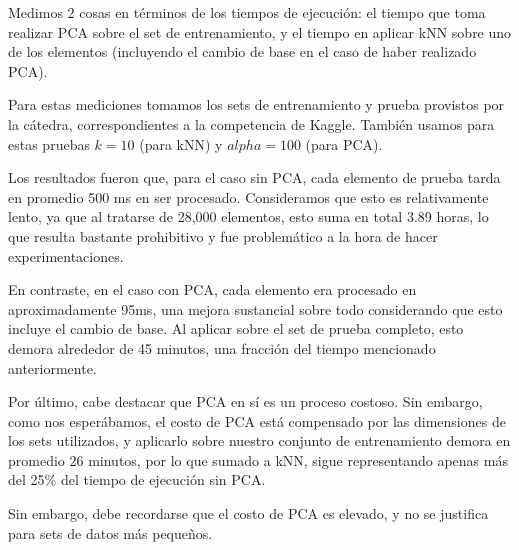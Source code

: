 Medimos 2 cosas en términos de los tiempos de ejecución: el tiempo que toma realizar PCA sobre el set de entrenamiento, y el tiempo en aplicar kNN sobre uno de los elementos (incluyendo el cambio de base en el caso de haber realizado PCA).

Para estas mediciones tomamos los sets de entrenamiento y prueba provistos por la cátedra, correspondientes a la competencia de Kaggle. También usamos para estas pruebas $k = 10$ (para kNN) y $alpha = 100$ (para PCA). 

Los resultados fueron que, para el caso sin PCA, cada elemento de prueba tarda en promedio 500 ms en ser procesado. Consideramos que esto es relativamente lento, ya que al tratarse de 28,000 elementos, esto suma en total 3.89 horas, lo que resulta bastante prohibitivo y fue problemático a la hora de hacer experimentaciones.

En contraste, en el caso con PCA, cada elemento era procesado en aproximadamente 95ms, una mejora sustancial sobre todo considerando que esto incluye el cambio de base. Al aplicar sobre el set de prueba completo, esto demora alrededor de 45 minutos, una fracción del tiempo mencionado anteriormente.

Por último, cabe destacar que PCA en sí es un proceso costoso. Sin embargo, como nos esperábamos, el costo de PCA está compensado por las dimensiones de los sets utilizados, y aplicarlo sobre nuestro conjunto de entrenamiento demora en promedio 26 minutos, por lo que sumado a kNN, sigue representando apenas más del 25\% del tiempo de ejecución sin PCA.

Sin embargo, debe recordarse que el costo de PCA es elevado, y no se justifica para sets de datos más pequeños.